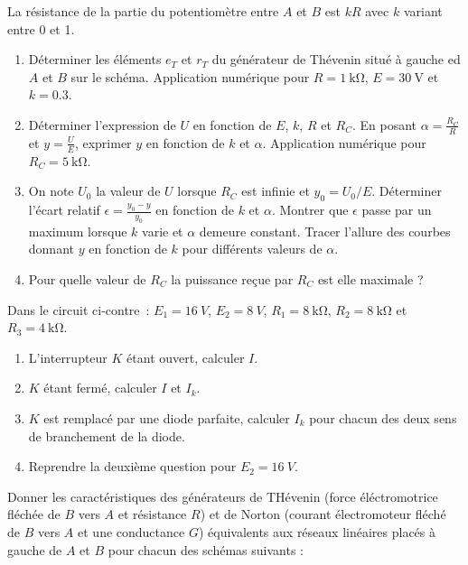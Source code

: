 \begin{exercice}
La résistance de la partie du potentiomètre entre $A$ et $B$ est $kR$ avec $k$ variant entre 0 et 1.
	\begin{enumerate}
		\item Déterminer les éléments $e_T$ et $r_T$ du générateur de Thévenin situé à gauche ed $A$ et $B$ sur le schéma. Application numérique pour $R=\SI{1}{\kilo\ohm}$, $E=\SI{30}{\volt}$ et $k=0.3$.
		\item Déterminer l'expression de $U$ en fonction de $E$, $k$, $R$ et $R_C$. En posant $\alpha = \frac{R_C}{R}$ et $y= \frac{U}{E}$, exprimer $y$ en fonction de $k$ et $\alpha$. Application numérique pour $R_C=\SI{5}{\kilo\ohm}$.
		\item On note $U_0$ la valeur de $U$ lorsque $R_C$ est infinie et $y_0 = U_0/E$. Déterminer l'écart relatif $\epsilon = \frac{y_0-y}{y_0}$ en fonction de $k$ et $\alpha$. Montrer que $\epsilon$ passe par un maximum lorsque $k$ varie et $\alpha$ demeure constant. Tracer l'allure des courbes donnant $y$ en fonction de $k$ pour différents valeurs de $\alpha$.
		\item Pour quelle valeur de $R_C$ la puissance reçue par $R_C$ est elle maximale ?
	\end{enumerate}
\end{exercice}

\begin{exercice}
	Dans le circuit ci-contre~: $E_1=\SI{16}{V}$, $E_2 = \SI{8}{V}$, $R_1 = \SI{8}{\kilo\ohm}$, $R_2 = \SI{8}{\kilo\ohm}$ et $R_3 = \SI{4}{\kilo\ohm}$.
	\begin{enumerate}
		\item L'interrupteur $K$ étant ouvert, calculer $I$.
		\item $K$ étant fermé, calculer $I$ et $I_k$.
		\item $K$ est remplacé par une diode parfaite, calculer $I_k$ pour chacun des deux sens de branchement de la diode.
		\item Reprendre la deuxième question pour $E_2 = \SI{16}{V}$.
	\end{enumerate}
\end{exercice}

\begin{exercice}
	Donner les caractéristiques des générateurs de THévenin (force éléctromotrice fléchée de $B$ vers $A$ et résistance $R$) et de Norton (courant électromoteur fléché de $B$ vers $A$ et une conductance $G$) équivalents aux réseaux linéaires placés à gauche de $A$ et $B$ pour chacun des schémas suivants :
\end{exercice}
